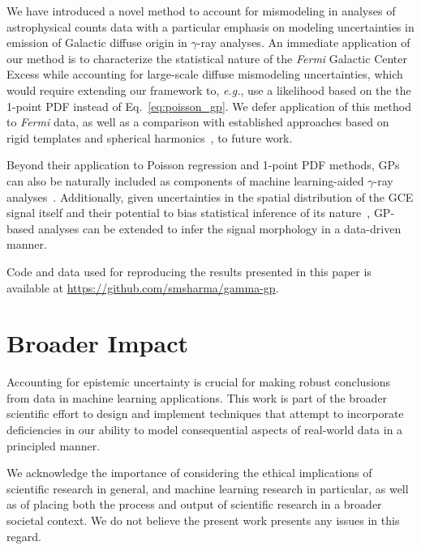 \documentclass[]{article}
\begin{document}
We have introduced a novel method to account for mismodeling in analyses of astrophysical counts data with a particular emphasis on modeling uncertainties in emission of Galactic diffuse origin in $\gamma$-ray analyses. An immediate application of our method is to characterize the statistical nature of the \emph{Fermi} Galactic Center Excess while accounting for large-scale diffuse mismodeling uncertainties, which would require extending our framework to, \emph{e.g.}, use a likelihood based on the the 1-point PDF instead of Eq.~\eqref{eq:poisson_gp}. We defer application of this method to \emph{Fermi} data, as well as a comparison with established approaches based on rigid templates and spherical harmonics~\cite{Buschmann:2020adf}, to future work.

Beyond their application to Poisson regression and 1-point PDF methods, GPs can also be naturally included as components of machine learning-aided $\gamma$-ray analyses~\cite{List:2020mzd,Caron:2017udl}. Additionally, given uncertainties in the spatial distribution of the GCE signal itself and their potential to bias statistical inference of its nature~\cite{Leane:2020nmi,Leane:2020pfc}, GP-based analyses can be extended to infer the signal morphology in a data-driven manner. 

Code and data used for reproducing the results presented in this paper is available at \url{https://github.com/smsharma/gamma-gp}.

\section*{Broader Impact}
\label{sec:impact}

Accounting for epistemic uncertainty is crucial for making robust conclusions from data in machine learning applications. This work is part of the broader scientific effort to design and implement techniques that attempt to incorporate deficiencies in our ability to model consequential aspects of real-world data in a principled manner.

We acknowledge the importance of considering the ethical implications of scientific research in general, and machine learning research in particular, as well as of placing both the process and output of scientific research in a broader societal context. We do not believe the present work presents any issues in this regard. 
\end{document}
